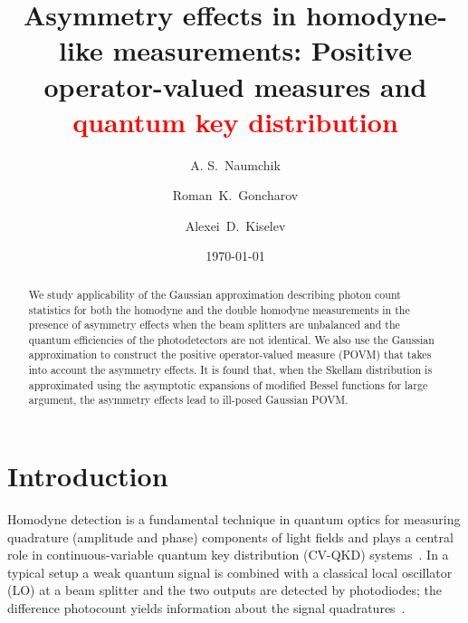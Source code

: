 \documentclass[%
reprint,
superscriptaddress,
 amsmath,amssymb,amsfonts,
 aps,
 pra,
 longbibliography
]{revtex4-2}
\begin{document}
\title{
  Asymmetry effects in homodyne-like measurements: Positive operator-valued measures and \textcolor{red}{quantum key distribution}
}

\author{A. S.~Naumchik}


\author{Roman~K.~Goncharov}


\author{Alexei~D.~Kiselev}

\date{\today}

\begin{abstract}
  We study applicability of
  the Gaussian approximation describing
  photon count statistics for both the homodyne and the double homodyne
  measurements in the presence of asymmetry effects when
  the beam splitters are unbalanced and the quantum efficiencies of
  the photodetectors are not identical.
We also use the Gaussian approximation to construct
the positive operator-valued measure (POVM) that takes into account the asymmetry effects. 
It is found that, when the Skellam distribution is approximated using the asymptotic expansions of
modified Bessel functions for large argument,
the asymmetry effects lead to ill-posed Gaussian POVM.
\end{abstract}
 
 \maketitle

\section{Introduction}
\label{sec:intro}

Homodyne detection is a fundamental technique in quantum optics for measuring quadrature (amplitude and phase) components of light fields and plays a central role in continuous-variable quantum key distribution (CV-QKD) systems~\cite{PhysRevLett.88.057902,PhysRevLett.93.170504,RevModPhys.84.621,e17096072,opt3040030,Zhang:apr:2024,Gaidash:pra:2024}. In a typical setup a weak quantum signal is combined with a classical local oscillator (LO) at a beam splitter and the two outputs are detected by photodiodes; the difference photocount yields information about the signal quadratures~\cite{Vogel:pra:1993,Kelley:pr:1964}.
\end{document}
